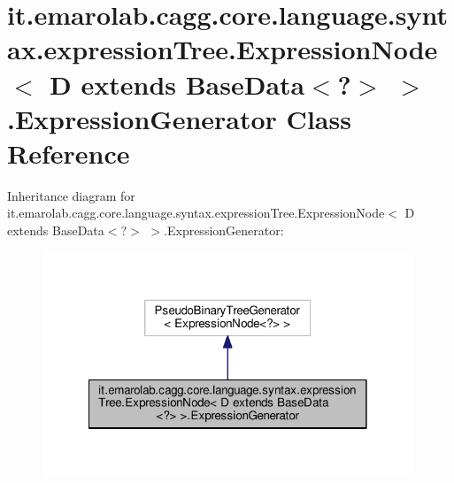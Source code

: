 \hypertarget{classit_1_1emarolab_1_1cagg_1_1core_1_1language_1_1syntax_1_1expressionTree_1_1ExpressionNode_3_1b62a0c49b9a1ba31afa9c9176f7217e}{\section{it.\-emarolab.\-cagg.\-core.\-language.\-syntax.\-expression\-Tree.\-Expression\-Node$<$ D extends Base\-Data$<$?$>$ $>$.Expression\-Generator Class Reference}
\label{classit_1_1emarolab_1_1cagg_1_1core_1_1language_1_1syntax_1_1expressionTree_1_1ExpressionNode_3_1b62a0c49b9a1ba31afa9c9176f7217e}
}


Inheritance diagram for it.\-emarolab.\-cagg.\-core.\-language.\-syntax.\-expression\-Tree.\-Expression\-Node$<$ D extends Base\-Data$<$?$>$ $>$.Expression\-Generator\-:\nopagebreak
\begin{figure}[H]
\begin{center}
\leavevmode
\includegraphics[width=314pt]{classit_1_1emarolab_1_1cagg_1_1core_1_1language_1_1syntax_1_1expressionTree_1_1ExpressionNode_3_b2f7650804e7964e487e837bdc3131ff}
\end{center}
\end{figure}



